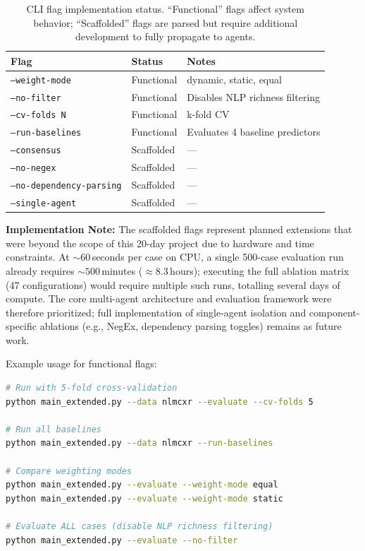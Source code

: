 \documentclass[12pt]{article}
\begin{document}
\begin{table}[ht]
\centering
\small
\begin{tabular}{lll}
\toprule
\textbf{Flag} & \textbf{Status} & \textbf{Notes} \\
\midrule
\texttt{--weight-mode} & Functional & dynamic, static, equal \\
\texttt{--no-filter} & Functional & Disables NLP richness filtering \\
\texttt{--cv-folds N} & Functional & k-fold CV \\
\texttt{--run-baselines} & Functional & Evaluates 4 baseline predictors \\
\texttt{--consensus} & Scaffolded & --- \\
\texttt{--no-negex} & Scaffolded & --- \\
\texttt{--no-dependency-parsing} & Scaffolded & --- \\
\texttt{--single-agent} & Scaffolded & --- \\
\bottomrule
\end{tabular}
\caption{CLI flag implementation status. ``Functional'' flags affect system behavior; ``Scaffolded'' flags are parsed but require additional development to fully propagate to agents.}
\label{tab:cli-status}
\end{table}

\noindent\textbf{Implementation Note:} The scaffolded flags represent planned extensions that were beyond the scope of this 20-day project due to hardware and time constraints. At ${\sim}60$\,seconds per case on CPU, a single 500-case evaluation run already requires ${\sim}500$\,minutes (${\approx}8.3$\,hours); executing the full ablation matrix (47 configurations) would require multiple such runs, totalling several days of compute. The core multi-agent architecture and evaluation framework were therefore prioritized; full implementation of single-agent isolation and component-specific ablations (e.g., NegEx, dependency parsing toggles) remains as future work.

Example usage for functional flags:

\begin{lstlisting}[language=bash, caption={Ablation study CLI usage (functional flags).}]
# Run with 5-fold cross-validation
python main_extended.py --data nlmcxr --evaluate --cv-folds 5

# Run all baselines
python main_extended.py --data nlmcxr --run-baselines

# Compare weighting modes
python main_extended.py --evaluate --weight-mode equal
python main_extended.py --evaluate --weight-mode static

# Evaluate ALL cases (disable NLP richness filtering)
python main_extended.py --evaluate --no-filter
\end{lstlisting}
\end{document}
